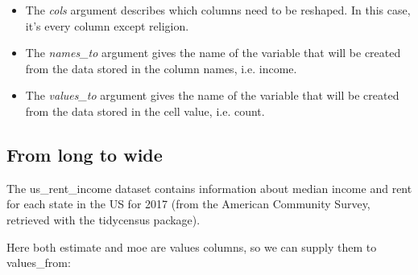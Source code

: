 \begin{itemize}
\item The \textit{cols} argument describes which columns need to be reshaped. In this case, it’s every column except religion.

\item The \textit{names\_to} argument gives the name of the variable that will be created from the data stored in the column names, i.e. income.

\item The \textit{values\_to} argument gives the name of the variable that will be created from the data stored in the cell value, i.e. count.

\end{itemize}

\subsection{From long to wide}


The us\_rent\_income dataset contains information about median income and rent for each state in the US for 2017 (from the American Community Survey, retrieved with the tidycensus package).


\begin{knitrout}
\color{fgcolor}\begin{kframe}
\begin{alltt}
\end{alltt}


{\ttfamily\noindent\bfseries\color{errorcolor}{\#\# Error in eval(expr, envir, enclos): object 'us\_rent\_income' not found}}\end{kframe}
\end{knitrout}

Here both estimate and moe are values columns, so we can supply them to values\_from:

\begin{knitrout}
\color{fgcolor}
\end{knitrout}



